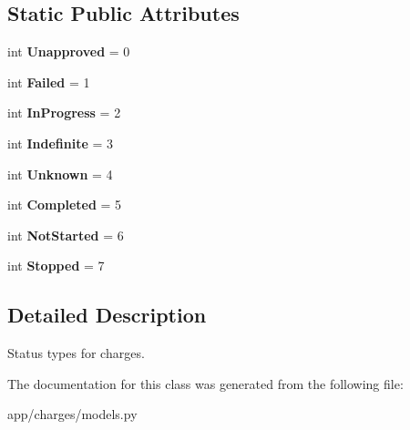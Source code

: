 \subsection*{Static Public Attributes}
\begin{DoxyCompactItemize}
\item 
\mbox{\label{classapp_1_1charges_1_1models_1_1_status_type_a2bf05f149fd78d609ca9baba78886c68}} 
int {\bfseries Unapproved} = 0
\item 
\mbox{\label{classapp_1_1charges_1_1models_1_1_status_type_a60b90f5febb9da5281f6d2a2f9f6d671}} 
int {\bfseries Failed} = 1
\item 
\mbox{\label{classapp_1_1charges_1_1models_1_1_status_type_abc57b85f75f07de1021f80b0507ffb87}} 
int {\bfseries In\+Progress} = 2
\item 
\mbox{\label{classapp_1_1charges_1_1models_1_1_status_type_a1274e714ca7dca6fd6e5c7cb5dcc751c}} 
int {\bfseries Indefinite} = 3
\item 
\mbox{\label{classapp_1_1charges_1_1models_1_1_status_type_abaf74561902ff9d02600769c5176c560}} 
int {\bfseries Unknown} = 4
\item 
\mbox{\label{classapp_1_1charges_1_1models_1_1_status_type_af5c57965eb7cf4589e19e6f1cdf43d64}} 
int {\bfseries Completed} = 5
\item 
\mbox{\label{classapp_1_1charges_1_1models_1_1_status_type_a1198d8722f0daa3f82f6ff69d88b0275}} 
int {\bfseries Not\+Started} = 6
\item 
\mbox{\label{classapp_1_1charges_1_1models_1_1_status_type_a7c7b79a3607c74522411acff4525f146}} 
int {\bfseries Stopped} = 7
\end{DoxyCompactItemize}


\subsection{Detailed Description}
Status types for charges. 

The documentation for this class was generated from the following file\+:\begin{DoxyCompactItemize}
\item 
app/charges/models.\+py\end{DoxyCompactItemize}
